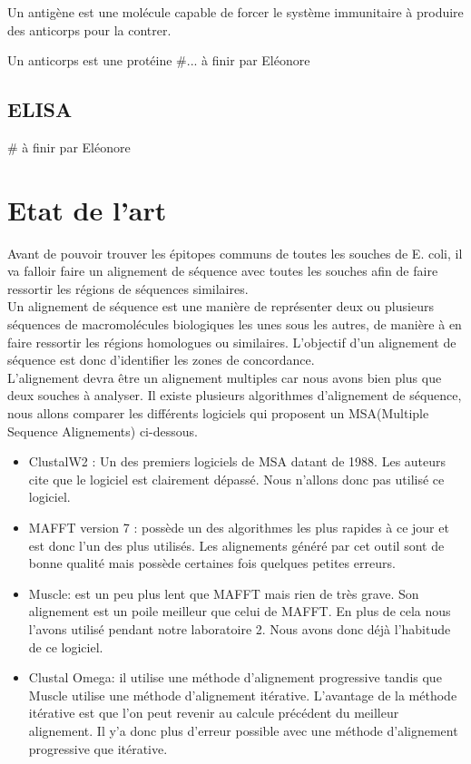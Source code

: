 \documentclass{article}
\begin{document}
      Un antigène est une molécule capable de forcer le système immunitaire à produire des anticorps pour la contrer.
      
      Un anticorps est une protéine \#... à finir par Eléonore
      
    \subsection{ELISA}
      \# à finir par Eléonore
  \section{Etat de l'art}
Avant de pouvoir trouver les épitopes communs de toutes les souches de E. coli, il va falloir faire un alignement de séquence avec toutes les souches afin de faire ressortir les régions de séquences similaires. \\

Un alignement de séquence est une manière de représenter deux ou plusieurs séquences de macromolécules biologiques les unes sous les autres, de manière à en faire ressortir les régions homologues ou similaires. L'objectif d'un alignement de séquence est donc d'identifier les zones de concordance. \\

 L'alignement devra être un alignement multiples car nous avons bien plus que deux souches à analyser. Il existe plusieurs algorithmes d'alignement de séquence, nous allons comparer les différents logiciels qui proposent un MSA(Multiple Sequence Alignements) ci-dessous.
 
 
\begin{itemize}
  \item ClustalW2 : Un des premiers logiciels de MSA datant de 1988. Les auteurs cite que le logiciel est clairement dépassé. Nous n'allons donc pas utilisé ce logiciel. 
  \item MAFFT version 7 : possède un des algorithmes les plus rapides à ce jour et est donc l'un des plus utilisés. Les alignements généré par cet outil sont de bonne qualité mais possède certaines fois quelques petites erreurs.
  
  \item Muscle: est un peu plus lent que MAFFT mais rien de très grave. Son alignement est un poile meilleur que celui de MAFFT. En plus de cela nous l'avons utilisé pendant notre laboratoire 2. Nous avons donc déjà l'habitude de ce logiciel. 

	\item Clustal Omega: il utilise une méthode d'alignement progressive tandis que Muscle utilise une méthode d'alignement itérative. L'avantage de la méthode itérative est que l'on peut revenir au calcule précédent du meilleur alignement. Il y'a donc plus d'erreur possible avec une méthode d'alignement progressive que itérative.
	
\end{itemize}
\end{document}
